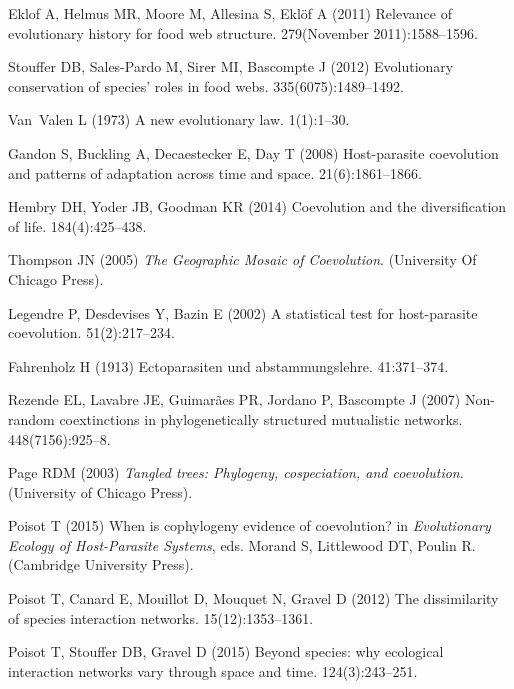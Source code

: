 \documentclass{pnastwo}
\begin{document}
\begin{article}
\begin{thebibliography}{10}
Eklof A, Helmus MR, Moore M, Allesina S, Ekl{\"o}f A (2011) Relevance of
  evolutionary history for food web structure.
 279(November 2011):1588--1596.

Stouffer DB, Sales-Pardo M, Sirer MI, Bascompte J (2012) Evolutionary
  conservation of species' roles in food webs.
 335(6075):1489--1492.

Van~Valen L (1973) A new evolutionary law.
 1(1):1--30.

Gandon S, Buckling A, Decaestecker E, Day T (2008) Host-parasite coevolution
  and patterns of adaptation across time and space.
 21(6):1861--1866.

Hembry DH, Yoder JB, Goodman KR (2014) Coevolution and the diversification of
  life.
 184(4):425--438.

Thompson JN (2005) {\em The Geographic Mosaic of Coevolution}.
\newblock (University Of Chicago Press).

Legendre P, Desdevises Y, Bazin E (2002) A statistical test for host-parasite
  coevolution.
 51(2):217--234.

Fahrenholz H (1913) Ectoparasiten und abstammungslehre.
 41:371--374.

Rezende EL, Lavabre JE, Guimar{\~a}es PR, Jordano P, Bascompte J (2007)
  Non-random coextinctions in phylogenetically structured mutualistic networks.
 448(7156):925--8.

Page RDM (2003) {\em Tangled trees: Phylogeny, cospeciation, and coevolution}.
\newblock (University of Chicago Press).

Poisot T (2015) When is cophylogeny evidence of coevolution? in {\em
  Evolutionary Ecology of Host-Parasite Systems}, eds.{} Morand S, Littlewood
  DT, Poulin R.
\newblock (Cambridge University Press).

Poisot T, Canard E, Mouillot D, Mouquet N, Gravel D (2012) The dissimilarity of
  species interaction networks.
 15(12):1353--1361.

Poisot T, Stouffer DB, Gravel D (2015) Beyond species: why ecological
  interaction networks vary through space and time.
 124(3):243--251.


\end{thebibliography}
\end{article}
\end{document}
